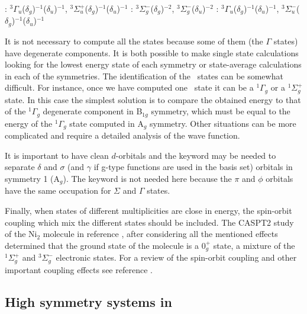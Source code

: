 \TBOU: $^3\Gamma_u$($\delta_g$)$^{-1}$($\delta_u$)$^{-1}$,
       $^3\Sigma_u^+$($\delta_g$)$^{-1}$($\delta_u$)$^{-1}$\newline
\TBOG: $^3\Sigma_g^-$($\delta_g$)$^{-2}$, $^3\Sigma_g^-$($\delta_u$)$^{-2}$\newline
\TAOU: $^3\Gamma_u$($\delta_g$)$^{-1}$($\delta_u$)$^{-1}$,
       $^3\Sigma_u^-$($\delta_g$)$^{-1}$($\delta_u$)$^{-1}$

It is not necessary to compute all the states because some of
them (the $\Gamma$ states) have degenerate components. It is both
possible to make single state calculations looking for the lowest
energy state of each symmetry or state-average calculations in each of
the symmetries. The identification of the \Dinfh\ states can be 
somewhat difficult. For instance, once we have computed one
\SAOG\ state it can be a $^1\Gamma_g$ or a $^1\Sigma_g^+$ state.
In this case the simplest solution is to compare the obtained 
energy to that of the $^1\Gamma_g$ degenerate component in
B$_{1g}$ symmetry, which must be equal to the energy of the
$^1\Gamma_g$ state computed in A$_g$ symmetry. Other situations
can be more complicated and require a detailed analysis of the
wave function.

It is important to have clean $d$-orbitals and the 
keyword may be needed to separate $\delta$ and $\sigma$ 
(and $\gamma$ if g-type functions are used in the basis set)
orbitals in symmetry 1 (A$_g$). The  keyword
is not needed here because the $\pi$ and $\phi$ orbitals have
the same occupation for $\Sigma$ and $\Gamma$ states.


Finally, when states of different multiplicities are close in 
energy, the spin-orbit coupling which mix the different states
should be included. The CASPT2 study of the Ni$_2$ molecule
in reference \cite{Pou:94}, after considering all the mentioned
effects determined that the ground
state of the molecule is a 0$_g^+$ state, a mixture of the
$^1\Sigma^+_g$ and $^3\Sigma^-_g$ electronic states.
For a review of the spin-orbit coupling and other important
coupling effects see reference \cite{Peric:95}.

\subsection{High symmetry systems in \molcas}
\label{TUT:sec:hsym}


